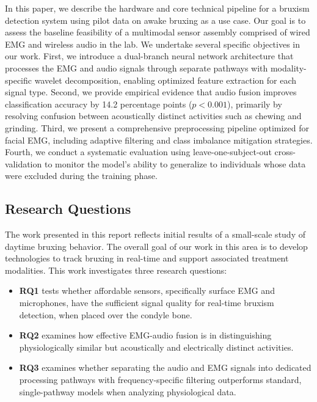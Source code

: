 \documentclass[pdflatex,sn-vancouver-num, iicol]{sn-jnl}
\begin{document}
 In this paper, we describe the hardware and core technical pipeline for a bruxism detection system using pilot data on awake bruxing as a use case. Our goal is to assess the baseline feasibility of a multimodal sensor assembly comprised of wired EMG and wireless audio in the lab. We undertake several specific objectives in our work. First, we introduce a dual-branch neural network architecture that processes the EMG and audio signals through separate pathways with modality-specific wavelet decomposition, enabling optimized feature extraction for each signal type. Second, we provide empirical evidence that audio fusion improves classification accuracy by 14.2 percentage points ($p < 0.001$), primarily by resolving confusion between acoustically distinct activities such as chewing and grinding. Third, we present a comprehensive preprocessing pipeline optimized for facial EMG, including adaptive filtering and class imbalance mitigation strategies. Fourth, we conduct a systematic evaluation using leave-one-subject-out cross-validation to monitor the model's ability to generalize to individuals whose data were excluded during the training phase.



\subsection{Research Questions}

The work presented in this report reflects initial results of a small-scale study of daytime bruxing behavior. The overall goal of our work in this area is to develop technologies to track bruxing in real-time and support associated treatment modalities. This work investigates three research questions:

\begin{itemize}
    \item \textbf{RQ1} tests whether affordable sensors, specifically surface EMG and microphones, have the sufficient signal quality for real-time bruxism detection, when placed over the condyle bone.
    \item \textbf{RQ2} examines how effective EMG-audio fusion is in distinguishing physiologically similar but acoustically and electrically distinct activities.
    \item \textbf{RQ3} examines whether separating the audio and EMG signals into dedicated processing pathways with frequency-specific filtering outperforms standard, single-pathway models when analyzing physiological data.  
\end{itemize}
\end{document}
